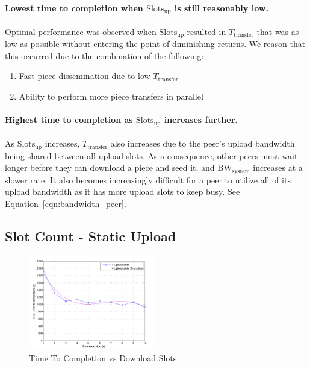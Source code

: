 \documentclass[a4paper,12pt,twocolumn]{article}
\newcommand{\eref}[1]{Equation~\ref{#1}}
\begin{document}
\paragraph{Lowest time to completion when $\text{Slots}_{\text{up}}$ is still reasonably low.} Optimal performance was observed when $\text{Slots}_{\text{up}}$ resulted in $T_{\text{transfer}}$ that was as low as possible without entering the point of diminishing returns. 
We reason that this occurred due to the combination of the following:

\begin{enumerate}
  \item Fast piece dissemination due to low $T_{\text{transfer}}$
  \item Ability to perform more piece transfers in parallel
\end{enumerate}

\paragraph{Highest time to completion as $\text{Slots}_{\text{up}}$ increases further.} As $\text{Slots}_{\text{up}}$ increases, $T_{\text{transfer}}$ also increases due to the peer's upload bandwidth being shared between all upload slots. 
As a consequence, other peers must wait longer before they can download a piece and seed it, and $\text{BW}_{\text{system}}$ increases at a slower rate. 
It also becomes increasingly difficult for a peer to utilize all of its upload bandwidth as it has more upload slots to keep busy. See \eref{eqn:bandwidth_peer}.

\subsection{Slot Count - Static Upload}
\label{subsec:slots_results_static_upload}

\begin{figure}[!htbp]
  \centering
  \includegraphics[width=0.49\textwidth]{figs/Experiment1_U4_TTC}
  \caption{Time To Completion vs Download Slots}
  \label{fig:slots_static_upload}
\end{figure}
\end{document}
